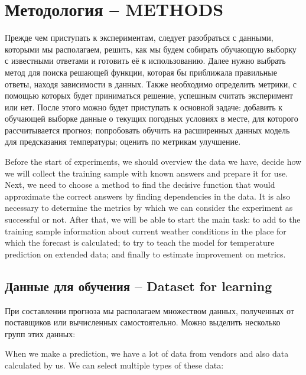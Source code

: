\documentclass[14pt]{matmex-diploma}
\begin{document}
\section{Методология -- METHODS}
Прежде чем приступать к экспериментам, следует разобраться с данными, которыми мы располагаем, решить, как мы будем собирать обучающую выборку с известными ответами и готовить её к использованию. Далее нужно выбрать метод для поиска решающей функции, которая бы приближала правильные ответы, находя зависимости в данных. Также необходимо определить метрики, с помощью которых будет приниматься решение, успешным считать эксперимент или нет. После этого можно будет приступать к основной задаче: добавить к обучающей выборке данные о текущих погодных условиях в месте, для которого рассчитывается прогноз; попробовать обучить на расширенных данных модель для предсказания температуры; оценить по метрикам улучшение.

Before the start of experiments, we should overview the data we have, decide how we will collect the training sample with known answers and prepare it for use. Next, we need to choose a method to find the decisive function that would approximate the correct answers by finding dependencies in the data. It is also necessary to determine the metrics by which we can consider the experiment as successful or not. After that, we will be able to start the main task: to add to the training sample information about current weather conditions in the place for which the forecast is calculated; to try to teach the model for temperature prediction on extended data; and finally to estimate improvement on metrics.


\subsection{Данные для обучения -- Dataset for learning}
При составлении прогноза мы располагаем множеством данных, полученных от поставщиков или вычисленных самостоятельно. Можно выделить несколько групп этих данных:

When we make a prediction, we have a lot of data from vendors and also data calculated by us. We can select multiple types of these data:
\end{document}
